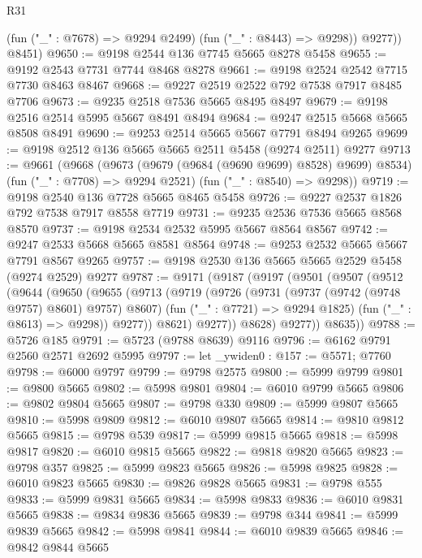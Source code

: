 \begin{lexlean}{R31}
\begin{coremodule}
            (fun ("_" : @7678) => @9294 @2499)
            (fun ("_" : @8443) => @9298))
          @9277))
      @8451)
@9650 := @9198 @2544 @136 @7745 @5665 @8278 @5458
@9655 := @9192 @2543 @7731 @7744 @8468 @8278
@9661 := @9198 @2524 @2542 @7715 @7730 @8463 @8467
@9668 := @9227 @2519 @2522 @792 @7538 @7917 @8485 @7706
@9673 := @9235 @2518 @7536 @5665 @8495 @8497
@9679 := @9198 @2516 @2514 @5995 @5667 @8491 @8494
@9684 := @9247 @2515 @5668 @5665 @8508 @8491
@9690 := @9253 @2514 @5665 @5667 @7791 @8494 @9265
@9699 := @9198 @2512 @136 @5665 @5665 @2511 @5458 (@9274 @2511) @9277
@9713 := @9661
    (@9668
      (@9673 (@9679 (@9684 (@9690 @9699) @8528) @9699) @8534)
      (fun ("_" : @7708) => @9294 @2521)
      (fun ("_" : @8540) => @9298))
@9719 := @9198 @2540 @136 @7728 @5665 @8465 @5458
@9726 := @9227 @2537 @1826 @792 @7538 @7917 @8558 @7719
@9731 := @9235 @2536 @7536 @5665 @8568 @8570
@9737 := @9198 @2534 @2532 @5995 @5667 @8564 @8567
@9742 := @9247 @2533 @5668 @5665 @8581 @8564
@9748 := @9253 @2532 @5665 @5667 @7791 @8567 @9265
@9757 := @9198 @2530 @136 @5665 @5665 @2529 @5458 (@9274 @2529) @9277
@9787 := @9171
    (@9187
      (@9197
        (@9501
          (@9507
            (@9512
              (@9644
                (@9650
                  (@9655
                    (@9713
                      (@9719
                        (@9726
                          (@9731 (@9737 (@9742 (@9748 @9757) @8601) @9757) @8607)
                          (fun ("_" : @7721) => @9294 @1825)
                          (fun ("_" : @8613) => @9298))
                        @9277))
                    @8621)
                  @9277))
              @8628)
            @9277))
        @8635))
@9788 := @5726 @185
@9791 := @5723 (@9788 @8639) @9116
@9796 := @6162 @9791 @2560 @2571 @2692 @5995
@9797 := let _ywiden0 : @157 := @5571; @7760
@9798 := @6000 @9797
@9799 := @9798 @2575
@9800 := @5999 @9799
@9801 := @9800 @5665
@9802 := @5998 @9801
@9804 := @6010 @9799 @5665
@9806 := @9802 @9804 @5665
@9807 := @9798 @330
@9809 := @5999 @9807 @5665
@9810 := @5998 @9809
@9812 := @6010 @9807 @5665
@9814 := @9810 @9812 @5665
@9815 := @9798 @539
@9817 := @5999 @9815 @5665
@9818 := @5998 @9817
@9820 := @6010 @9815 @5665
@9822 := @9818 @9820 @5665
@9823 := @9798 @357
@9825 := @5999 @9823 @5665
@9826 := @5998 @9825
@9828 := @6010 @9823 @5665
@9830 := @9826 @9828 @5665
@9831 := @9798 @555
@9833 := @5999 @9831 @5665
@9834 := @5998 @9833
@9836 := @6010 @9831 @5665
@9838 := @9834 @9836 @5665
@9839 := @9798 @344
@9841 := @5999 @9839 @5665
@9842 := @5998 @9841
@9844 := @6010 @9839 @5665
@9846 := @9842 @9844 @5665

\end{coremodule}
\end{lexlean}
